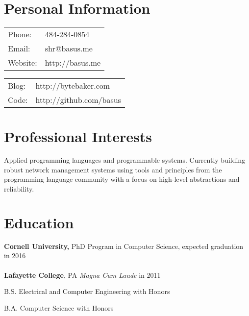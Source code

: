 \documentclass[margin,line]{resume}
\begin{document}

\begin{resume}


    \section{Personal Information}

    \begin{tabular}{l l}
      Phone: & 484-284-0854 \\
      Email: & shr@basus.me \\
      Website: & http://basus.me\\
    \end{tabular}
    \quad \hfill
    \begin{tabular}{l l}
      Blog: & http://bytebaker.com \\
      Code: & http://github.com/basus \\
    \end{tabular}

    \section{Professional Interests}
    Applied programming languages and programmable systems. Currently building
    robust network management systems using tools and principles from the
    programming language community with a focus on high-level abstractions and
    reliability.

    \section{Education}

    {\bf Cornell University,} PhD Program in Computer Science,
    expected graduation in 2016 \\
    \\
    {\bf Lafayette College}, PA \emph{Magna Cum Laude} in 2011%
    \begin{list2}
        \item B.S. Electrical and Computer Engineering with Honors
        \item B.A. Computer Science with Honors
    \end{list2}

\end{resume}
\end{document}

